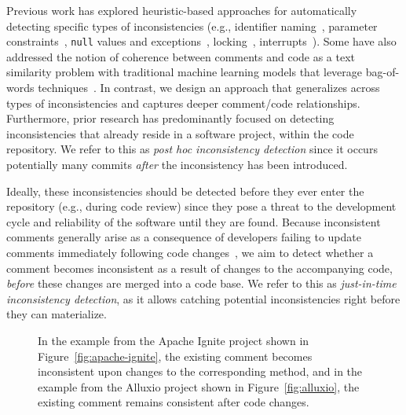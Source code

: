 \documentclass[letterpaper]{article} %
\newcommand{\Posthoc}{post hoc}
\newcommand{\JustInTime}{just-in-time}
\begin{document}
Previous work has explored heuristic-based approaches for automatically detecting specific types of inconsistencies
(e.g., identifier naming~\cite{ratol2017fragile}, parameter constraints~\cite{ZhouParameter}, \texttt{null} values and exceptions~\cite{tComment}, locking~\cite{icomment2007}, interrupts~\cite{aComment}). Some have also addressed the notion of coherence
between comments and code as a text similarity problem with traditional machine learning models that leverage bag-of-words techniques~\cite{Corazza18,Cimasa19}. In contrast, we design an approach that generalizes across types
of inconsistencies
and captures deeper comment/code relationships. Furthermore, prior research has predominantly focused on detecting inconsistencies that already reside in a software project, within the code repository. We refer to this as \textit{\Posthoc{} inconsistency detection} since it occurs potentially many commits \textit{after} the inconsistency has been introduced. %


Ideally, these inconsistencies should be detected before they ever enter the repository (e.g., during code review) since they pose a threat to the development cycle and reliability of the software until they are found. Because inconsistent comments generally arise as a consequence of developers failing to update comments immediately following code changes~\cite{WenLargeStudy}, we aim to detect whether a comment becomes inconsistent as a result of changes to the accompanying code, \textit{before} these changes are merged into a code base. We refer to this as \textit{\JustInTime{} inconsistency detection}, as it allows catching potential inconsistencies right before they can materialize.


\begin{figure}[t]
\centering
{}
\caption{In the example from the Apache Ignite project shown in Figure~\ref{fig:apache-ignite}, the existing comment becomes inconsistent upon changes to the corresponding method, and in the example from the Alluxio project shown in Figure~\ref{fig:alluxio}, the existing comment remains consistent after code changes.}
\label{fig:intro_example}
\end{figure}
\end{document}
